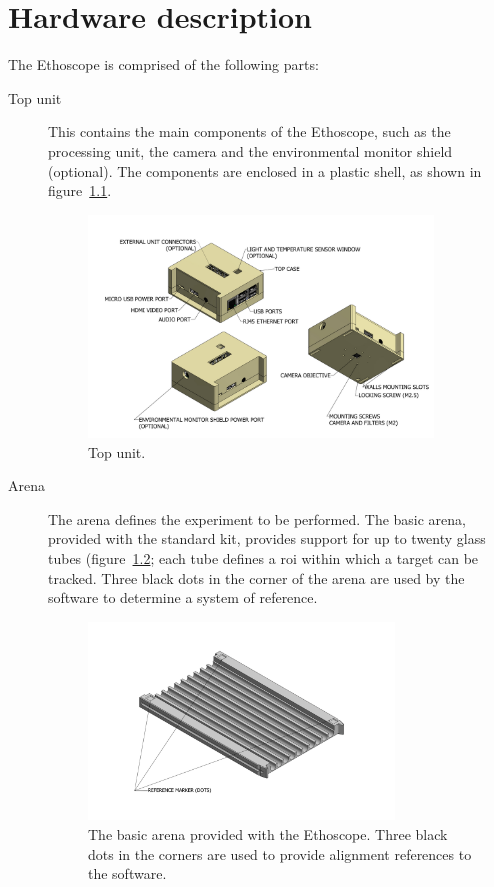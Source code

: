 \chapter{Hardware description}\label{ch:hardware}
The Ethoscope is comprised of the following parts:
\begin{description}
  \item[Top unit] This contains the main components of the Ethoscope, such as the processing unit, the camera and the environmental monitor shield (optional). The components are enclosed in a plastic shell, as shown in figure~\ref{fig:case_top}.
    \begin{figure}
      \centering
      \includegraphics[width=0.9\textwidth]{./images/BasicComponentsTop.pdf}
      \caption{Top unit.}
      \label{fig:case_top}
    \end{figure}
      
  \item[Arena] The arena defines the experiment to be performed. The basic arena, provided with the standard kit, provides support for up to twenty glass tubes (figure~\ref{fig:basic_arena}; each tube defines a \gls{roi} within which a target can be tracked. Three black dots in the corner of the arena are used by the software to determine a system of reference.
    \begin{figure}
      \centering
      \includegraphics[width=0.8\textwidth]{./images/view_arena.pdf}
      \caption{The basic arena provided with the Ethoscope. Three black dots in the corners are used to provide alignment references to the software.}
      \label{fig:basic_arena}
    \end{figure}
    

\end{description}
